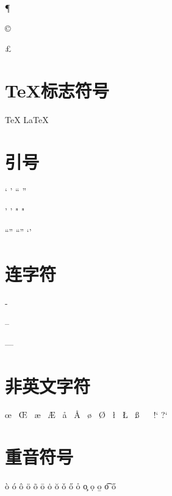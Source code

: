 \documentclass{article}
\begin{document}
    \P

    \dag

    \ddag

    \copyright

    \pounds




    \section{\TeX 标志符号}
    \TeX {} \LaTeX{} \LaTeXe{}
    \section{引号}
    ` ' ``  ''

    ' ' " "

    “” “” ‘’
    \section{连字符}
    -

    --

    ---
    \section{非英文字符}
    \oe ~ \OE ~ \ae ~ \AE ~ \aa ~ \AA ~ \o ~ \O ~ \l ~ \L ~ \ss ~ \SS ~ !` ?`

    \section{重音符号}
    \`o %
    \'o %
    \^o %
    \"o %
    \~o %
    \=o %
    \.o %
    \u{o} %
    \v{o} %
    \H{o} %
    \r{o} %
    \c{o} %
    \d{o} %
    \b{o} %
    \t{o} %
    \H{o} %
\end{document}
